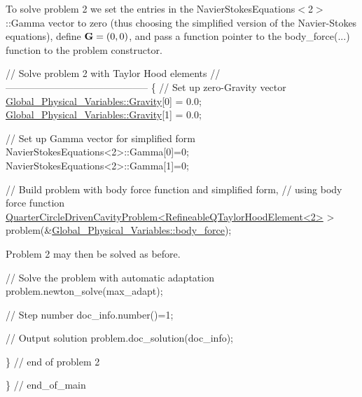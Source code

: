 To solve problem 2 we set the entries in the {\ttfamily Navier\+Stokes\+Equations$<$2$>$\+::\+Gamma} vector to zero (thus choosing the simplified version of the Navier-\/\+Stokes equations), define $ {\bf G} = (0,0)$, and pass a function pointer to the {\ttfamily body\+\_\+force}(...) function to the problem constructor.


\begin{DoxyCodeInclude}
 


 \textcolor{comment}{// Solve problem 2 with Taylor Hood elements}
 \textcolor{comment}{//--------------------------------------------}
 \{
  \textcolor{comment}{// Set up zero-Gravity vector}
  \hyperlink{namespaceGlobal__Physical__Variables_afae321364975eb56688ad13abc8ed6b7}{Global\_Physical\_Variables::Gravity}[0] = 0.0;
  \hyperlink{namespaceGlobal__Physical__Variables_afae321364975eb56688ad13abc8ed6b7}{Global\_Physical\_Variables::Gravity}[1] = 0.0;

  \textcolor{comment}{// Set up Gamma vector for simplified form}
  NavierStokesEquations<2>::Gamma[0]=0;
  NavierStokesEquations<2>::Gamma[1]=0;

  \textcolor{comment}{// Build problem with body force function and simplified form,}
  \textcolor{comment}{// using body force function}
  \hyperlink{classQuarterCircleDrivenCavityProblem}{QuarterCircleDrivenCavityProblem<RefineableQTaylorHoodElement<2>}
       >
   problem(&\hyperlink{namespaceGlobal__Physical__Variables_a87da705b8a46bed337cf5dbdd788b87b}{Global\_Physical\_Variables::body\_force});

\end{DoxyCodeInclude}


Problem 2 may then be solved as before.


\begin{DoxyCodeInclude}

  \textcolor{comment}{// Solve the problem with automatic adaptation}
  problem.newton\_solve(max\_adapt);
  
  \textcolor{comment}{// Step number}
  doc\_info.number()=1;

  \textcolor{comment}{// Output solution}
  problem.doc\_solution(doc\_info);

 \} \textcolor{comment}{// end of problem 2}

\} \textcolor{comment}{// end\_of\_main}

\end{DoxyCodeInclude}




